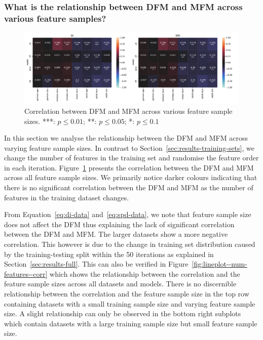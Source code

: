 \documentclass{article}
\begin{document}
\subsubsection{What is the relationship between DFM and MFM across various feature samples?}\label{sec:results-feature-sets}

\begin{figure}
  \centering
  \includegraphics[width=0.95\linewidth]{heatmap--corr--num-features.pdf}
  \caption{Correlation between DFM and MFM across various feature
  sample sizes. ***: $p\le0.01$; **: $p\le0.05$; *: $p\le0.1$}
  \label{fig:heatmap--corr--num-features}
\end{figure}

In this section we analyse the relationship between the DFM and MFM
across varying feature sample sizes. In contrast to
Section \ref{sec:results-training-sets}, we change the number of
features in the training set and randomise the feature order in each
iteration. Figure \ref{fig:heatmap--corr--num-features} presents the
correlation between the DFM and MFM across all feature sample
sizes. We primarily notice darker colours indicating that there is no
significant correlation between the DFM and MFM as the number of
features in the training dataset changes.

From Equation \ref{eq:di-data} and \ref{eq:spd-data}, we note that
feature sample size does not affect the DFM thus explaining the lack
of significant correlation between the DFM and MFM. The larger
datasets show a more negative correlation. This however is due to the
change in training set distribution caused by the training-testing
split within the 50 iterations as explained in
Section \ref{sec:results-full}. This can also be verified in
Figure \ref{fig:lineplot--num-features--corr} which shows the
relationship between the correlation and the feature sample sizes
across all datasets and models. There is no discernible relationship
between the correlation and the feature sample size in the top row
containing datasets with a small training sample size and varying
feature sample size. A slight relationship can only be observed in the
bottom right subplots which contain datasets with a large training
sample size but small feature sample size.
\end{document}
